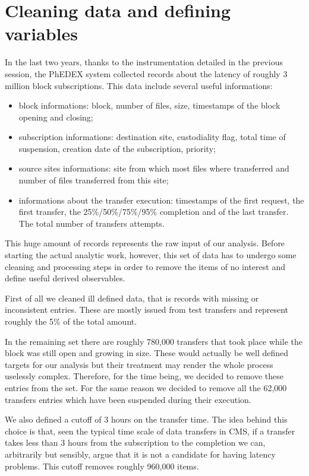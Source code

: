 \section{Cleaning data and defining variables}
\label{sec:cleaning}

In the last two years, thanks to the instrumentation detailed in the
previous session, the PhEDEX system collected records about the
latency of roughly 3 million block subscriptions.  This data include
several useful informations:

\begin{itemize}
\item block informations: block, number of files, size, timestamps of
    the block opening and closing;
\item subscription informations: destination site, custodiality flag,
    total time of suspension, creation date of the subscription,
    priority;
\item source sites informations: site from which most files where
    transferred and number of files transferred from this site;

\item informations about the transfer execution: timestamps of the first
    request, the first transfer, the 25\%/50\%/75\%/95\% completion and of
    the last transfer. The total number of transfers attempts.
\end{itemize}

This huge amount of records represents the raw input of our
analysis. Before starting the actual analytic work, however, this set
of data has to undergo some cleaning and processing steps in order to
remove the items of no interest and define useful derived observables.

First of all we cleaned ill defined data, that is records with missing
or inconsistent entries. These are mostly issued from test transfers
and represent roughly the 5\% of the total amount.

In the remaining set there are roughly 780,000 transfers that took
place while the block was still open and growing in size. These would
actually be well defined targets for our analysis but their treatment
may render the whole process uselessly complex. Therefore, for the
time being, we decided to remove these entries from the set. For the
same reason we decided to remove all the 62,000 transfers entries
which have been suspended during their execution.

We also defined a cutoff of 3 hours on the transfer time. The idea
behind this choice is that, seen the typical time scale of data
transfers in CMS, if a transfer takes less than 3 hours from the
subscription to the completion we can, arbitrarily but sensibly, argue
that it is not a candidate for having latency problems. This cutoff
removes roughly 960,000 items.

